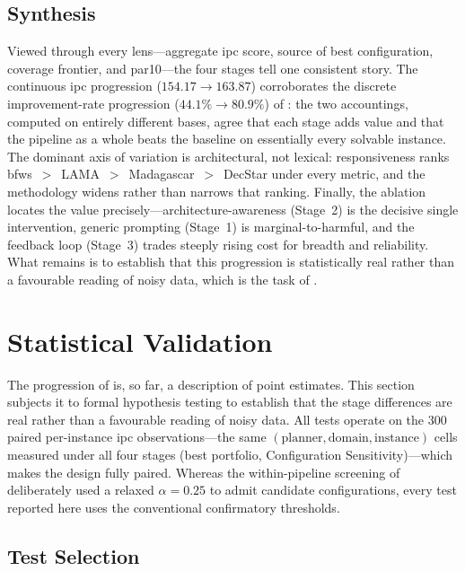 \subsection{Synthesis}
\label{sec:results:cross_stage:synthesis}

Viewed through every lens---aggregate \gls{ipc} score, source of best configuration, coverage frontier, and \gls{par10}---the four stages tell one consistent story. The continuous \gls{ipc} progression ($154.17 \rightarrow 163.87$) corroborates the discrete improvement-rate progression ($44.1\% \rightarrow 80.9\%$) of : the two accountings, computed on entirely different bases, agree that each stage adds value and that the pipeline as a whole beats the baseline on essentially every solvable instance. The dominant axis of variation is architectural, not lexical: responsiveness ranks \gls{bfws}~$>$~LAMA~$>$~Madagascar~$>$~DecStar under every metric, and the methodology widens rather than narrows that ranking. Finally, the ablation locates the value precisely---architecture-awareness (Stage~2) is the decisive single intervention, generic prompting (Stage~1) is marginal-to-harmful, and the feedback loop (Stage~3) trades steeply rising cost for breadth and reliability. What remains is to establish that this progression is statistically real rather than a favourable reading of noisy data, which is the task of .

\section{Statistical Validation}
\label{sec:results:statistical_validation}

The progression of  is, so far, a description of point estimates. This section subjects it to formal hypothesis testing to establish that the stage differences are real rather than a favourable reading of noisy data. All tests operate on the 300 paired per-instance \gls{ipc} observations---the same $(\text{planner}, \text{domain}, \text{instance})$ cells measured under all four stages (best portfolio, Configuration Sensitivity)---which makes the design fully paired. Whereas the within-pipeline screening of  deliberately used a relaxed $\alpha = 0.25$ to admit candidate configurations, every test reported here uses the conventional confirmatory thresholds.

\subsection{Test Selection}
\label{sec:results:statistical_validation:selection}

